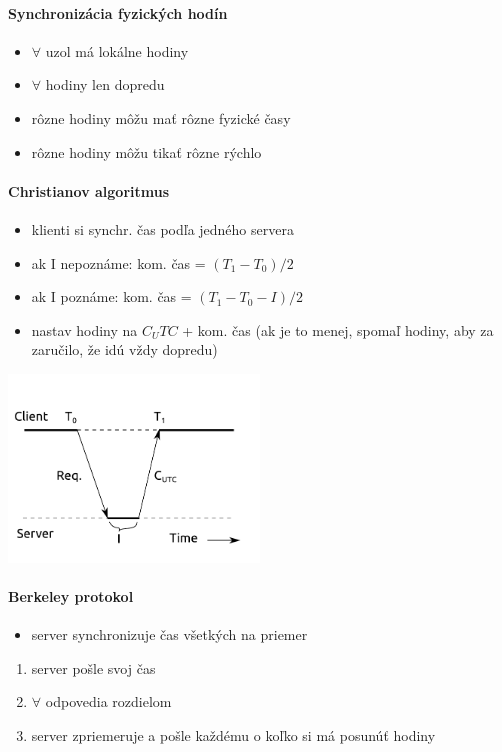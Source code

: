 \documentclass[a4paper]{report}
\begin{document}
\paragraph{Synchronizácia fyzických hodín}
\begin{itemize}
 \item $\forall$ uzol má lokálne hodiny
 \item $\forall$ hodiny len dopredu
 \item rôzne hodiny môžu mať rôzne fyzické časy
 \item rôzne hodiny môžu tikať rôzne rýchlo
\end{itemize}

\paragraph{Christianov algoritmus}
\begin{itemize}
 \item klienti si synchr. čas podľa jedného servera
 \item ak I nepoznáme: kom. čas = $(T_1 - T_0) / 2$
 \item ak I poznáme: kom. čas = $(T_1 - T_0 - I) / 2$
 \item nastav hodiny na $C_UTC$ + kom. čas (ak je to menej, spomaľ hodiny, aby za zaručilo,
 že idú vždy dopredu)
\end{itemize}

\includegraphics[width=0.5\textwidth]{obrazky/christianov-protokol}

\paragraph{Berkeley protokol}
\begin{itemize}
 \item server synchronizuje čas všetkých na priemer
\end{itemize}
\begin{enumerate}
 \item server pošle svoj čas
 \item $\forall$ odpovedia rozdielom
 \item server zpriemeruje a pošle každému o koľko si má posunúť hodiny
\end{enumerate}
\end{document}
